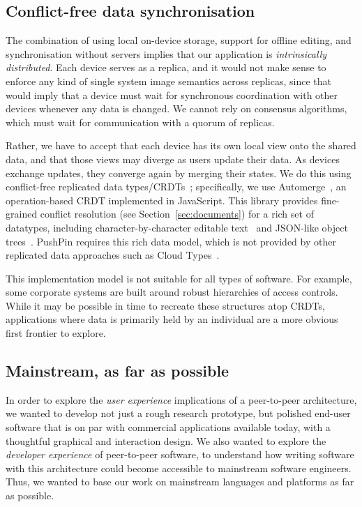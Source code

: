 \documentclass[sigplan,10pt]{acmart}
\begin{document}
\subsection{Conflict-free data synchronisation}

The combination of using local on-device storage, support for offline editing, and synchronisation without servers implies that our application is \emph{intrinsically distributed}.
Each device serves as a replica, and it would not make sense to enforce any kind of single system image semantics across replicas, since that would imply that a device must wait for synchronous coordination with other devices whenever any data is changed.
We cannot rely on consensus algorithms, which must wait for communication with a quorum of replicas.

Rather, we have to accept that each device has its own local view onto the shared data, and that those views may diverge as users update their data.
As devices exchange updates, they converge again by merging their states.
We do this using conflict-free replicated data types/CRDTs~\cite{Shapiro:2011un}; specifically, we use Automerge~\cite{Automerge:2018,Automerge}, an operation-based CRDT implemented in JavaScript.
This library provides fine-grained conflict resolution (see Section~\ref{sec:documents}) for a rich set of datatypes, including character-by-character editable text~\cite{Kleppmann:2019iu} and JSON-like object trees~\cite{Kleppmann:2017ca}.
PushPin requires this rich data model, which is not provided by other replicated data approaches such as Cloud Types~\cite{Burckhardt:2012jy}.

This implementation model is not suitable for all types of software. For example, some corporate systems are built around robust hierarchies of access controls. While it may be possible in time to recreate these structures atop CRDTs, applications where data is primarily held by an individual are a more obvious first frontier to explore.   

\subsection{Mainstream, as far as possible}

In order to explore the \emph{user experience} implications of a peer-to-peer architecture, we wanted to develop not just a rough research prototype, but polished end-user software that is on par with commercial applications available today, with a thoughtful graphical and interaction design.
We also wanted to explore the \emph{developer experience} of peer-to-peer software, to understand how writing software with this architecture could become accessible to mainstream software engineers.
Thus, we wanted to base our work on mainstream languages and platforms as far as possible.
\end{document}

